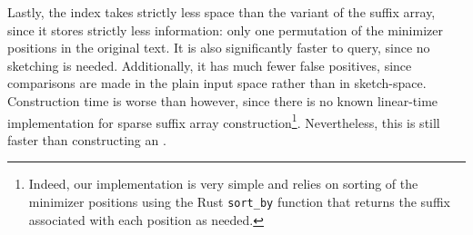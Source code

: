 Lastly, the {\sindex} index takes strictly less space than the {\uindex} variant of the suffix
array, since it stores strictly less information: only one permutation of the
minimizer positions in the original text.
It is also significantly faster to query, since no sketching is needed.
Additionally, it has much fewer false positives, since comparisons are made in
the plain input space rather than in sketch-space. Construction time is worse
than {\sa} however, since there is no known linear-time implementation for
sparse suffix array construction\footnote{Indeed, our implementation is very simple and relies on
sorting of the minimizer positions using the Rust
\texttt{sort\_by} function that returns the suffix associated with each
position as needed.}.
Nevertheless, this is still faster than constructing an {\fmindex}.

